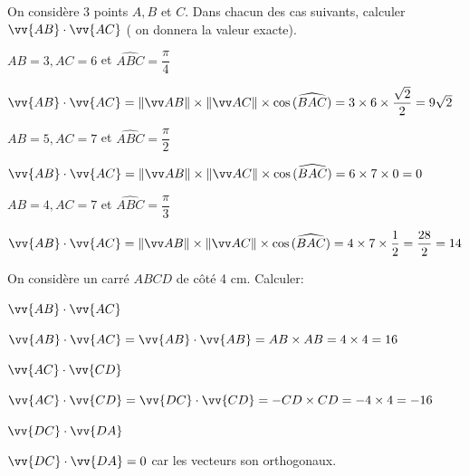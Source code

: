 \documentclass[a4paper,12pt]{article}        %
\begin{document}
On considère 3 points $A, B$ et $C$. Dans chacun des cas suivants, calculer $\vv{A B} \cdot \vv{A C}$ ( on donnera la valeur exacte).
	\begin{enumMet}
		\item $A B=3, A C=6$ et $\widehat{A B C}=\dfrac{\pi}{4}$
		\begin{corrBox}
			$\vv{AB}\cdot \vv{AC} = \normeB{AB}\times\normeB{AC}\times\cos{(\widehat{BAC})}=3\times6\times\dfrac{\sqrt{2}}{2}=9\sqrt{2}$   \quad {}
		\end{corrBox}
		\item $A B=5, A C=7$ et $\widehat{A B C}=\dfrac{\pi}{2}$
		\begin{corrBox}
			$\vv{AB}\cdot \vv{AC} = \normeB{AB}\times\normeB{AC}\times\cos{(\widehat{BAC})}=6\times7\times0=0$ \quad \bareme{0,5}
		\end{corrBox}
		\item $A B=4, A C=7$ et $\widehat{A B C}=\dfrac{\pi}{3}$
		\begin{corrBox}
			$\vv{AB}\cdot \vv{AC} = \normeB{AB}\times\normeB{AC}\times\cos{(\widehat{BAC})}=4\times7\times\dfrac{1}{2}=\dfrac{28}{2}=14$   \quad \bareme{1}
		\end{corrBox}
	\end{enumMet}
\newpage
\vspace{-0.3cm}
On considère un carré $A B C D$ de côté 4 cm. Calculer:
	\begin{enumMet}
		\item $\vv{A B} \cdot \vv{A C}$
		\begin{corrBox}
			$\vv{A B} \cdot \vv{A C}=\vv{A B} \cdot \vv{A B}=AB\times AB=4\times 4=16$  \quad \bareme{1}
		\end{corrBox}
		\item $\vv{AC} \cdot \vv{C D}$
		\begin{corrBox}
			$\vv{A C} \cdot \vv{CD}=\vv{DC} \cdot \vv{CD}=-CD\times CD=-4\times 4=-16$  \quad \bareme{1}
		\end{corrBox}
		\item $\vv{D C} \cdot \vv{D A}$
		\begin{corrBox}
			$\vv{DC} \cdot \vv{DA}=0$ car les vecteurs son orthogonaux.  \quad {}
		\end{corrBox}
	\end{enumMet}
\end{document}
